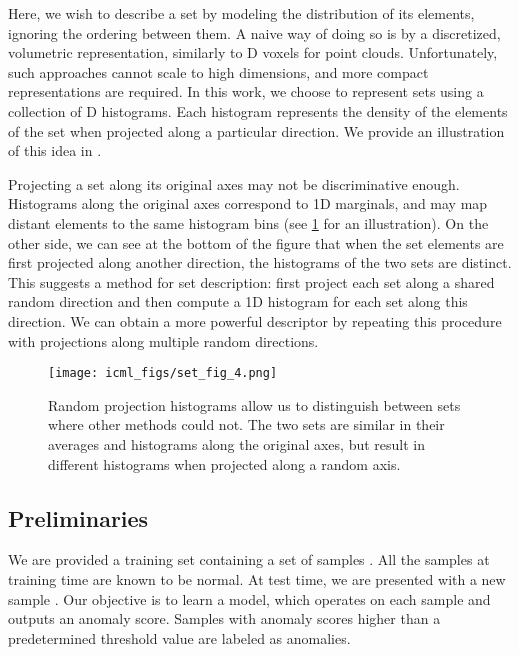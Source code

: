 \documentclass{article}
\begin{document}
Here, we wish to describe a set by modeling the distribution of its elements, ignoring the ordering between them. A naive way of doing so is by a discretized, volumetric representation, similarly to D voxels for point clouds. Unfortunately, such approaches cannot scale to high dimensions, and more compact representations are required. In this work, we choose to represent sets using a collection of D histograms. Each histogram represents the density of the elements of the set when projected along a particular direction. We provide an illustration of this idea in . 


Projecting a set along its original axes may not be discriminative enough. Histograms along the original axes correspond to 1D marginals, and may map distant elements to the same histogram bins (see \ref{fig:set_hists} for an illustration). On the other side, we can see at the bottom of the figure that when the set elements are first projected along another direction, the histograms of the two sets are distinct. This suggests a method for set description: first project each set along a shared random direction and then compute a 1D histogram for each set along this direction. We can obtain a more powerful descriptor by repeating this procedure with projections along multiple random directions. 


\begin{figure}
  \centering
  \texttt{[image: icml\_figs/set\_fig\_4.png]}

  \caption{ Random projection histograms allow us to distinguish between sets where other methods could not. The two sets are similar in their averages and histograms along the original axes, but result in different histograms when projected along a random axis. }
  \label{fig:set_hists}
  \vspace{5pt}
\end{figure}


\subsection{Preliminaries}
\label{subsec:prelim}


We are provided a training set  containing a set of  samples . All the samples at training time are known to be normal. At test time, we are presented with a new sample . Our objective is to learn a model, which operates on each sample  and outputs an anomaly score. Samples with anomaly scores higher than a predetermined threshold value are labeled as anomalies.
\end{document}
